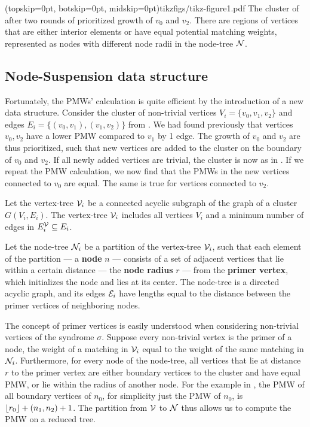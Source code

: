 \Figure[htb](topskip=0pt, botskip=0pt, midskip=0pt){tikzfigs/tikz-figure1.pdf}{
    The cluster of  after two rounds of prioritized growth of $v_0$ and $v_2$. There are regions of vertices that are either interior elements or have equal potential matching weights, represented as nodes with different node radii in the node-tree $\mathcal{N}$. \label{fig1}}

\subsection{Node-Suspension data structure}\label{sec:nodeset}

Fortunately, the PMWs' calculation is quite efficient by the introduction of a new data structure. Consider the cluster of non-trivial vertices $V_i=\{v_0,v_1,v_2\}$ and edges $E_i = \{(v_0,v_1), (v_1, v_2)\}$ from . We had found previously that vertices $v_0, v_2$ have a lower PMW compared to $v_1$ by 1 edge. The growth of $v_0$ and $v_2$ are thus prioritized, such that new vertices are added to the cluster on the boundary of $v_0$ and $v_2$. If all newly added vertices are trivial, the cluster is now as in . If we repeat the PMW calculation, we now find that the PMWs in the new vertices connected to $v_0$ are equal. The same is true for vertices connected to $v_2$. 
\begin{definition}\label{def:vertextree}
    Let the vertex-tree $\mathcal{V}_i$ be a connected acyclic subgraph of the graph of a cluster $G(V_i, E_i)$.   The vertex-tree $\mathcal{V}_i$ includes all vertices $V_i$ and a minimum number of edges in $E^{\mathcal{V}}_i \subseteq E_i$. 
\end{definition}
\begin{definition}
  Let the node-tree $\mathcal{N}_i$ be a partition of the vertex-tree $\mathcal{V}_i$, such that each element of the partition --- a \textbf{node} $n$ --- consists of a set of adjacent vertices that lie within a certain distance --- the \textbf{node radius} $r$ --- from the \textbf{primer vertex}, which initializes the node and lies at its center. The node-tree is a directed acyclic graph, and its edges $\mathcal{E}_i$ have lengths equal to the distance between the primer vertices of neighboring nodes. 
\end{definition}

The concept of primer vertices is easily understood when considering non-trivial vertices of the syndrome $\sigma$. Suppose every non-trivial vertex is the primer of a node, the weight of a matching in $\mathcal{V}_i$ equal to the weight of the same matching in $\mathcal{N}_i$. Furthermore, for every node of the node-tree, all vertices that lie at distance $r$ to the primer vertex are either boundary vertices to the cluster and have equal PMW, or lie within the radius of another node. For the example in , the PMW of all boundary vertices of $n_0$, for simplicity just the PMW of $n_0$, is ${\left \lfloor r_0 \right \rfloor } + (n_1, n_2) + 1$. The partition from $\mathcal{V}$ to $\mathcal{N}$ thus allows us to compute the PMW on a reduced tree. 

